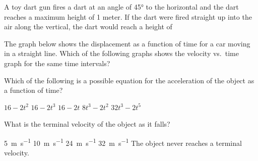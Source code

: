 \documentclass{../../../oss-classkick-exam}
\begin{document}
\begin{multicols*}{2}
\begin{questions}
    \question A toy dart gun fires a dart at an angle of \ang{45} to the
    horizontal and the dart reaches a maximum height of 1 meter. If the dart
    were fired straight up into the air along the vertical, the dart would
    reach a height of
    \columnbreak
    
    \question The graph below shows the displacement as a function of time for a
    car moving in a straight line. Which of the following graphs shows the
    velocity vs.\ time graph for the same time intervals?
    \\
    \columnbreak
    

    \question Which of the following is a possible equation for the
    acceleration of the object as a function of time?
    \begin{choices}
      \choice $16-2t^2$
      \choice $16-2t^3$
      \choice $16-2t$
      \choice $8t^3-2t^2$
      \choice $32t^3-2t^5$
    \end{choices}
    \label{q:fall1}
    
    \question What is the terminal velocity of the object as it falls?
    \begin{choices}
      \choice \SI{5}{\metre\per\second}
      \choice \SI{10}{\metre\per\second}
      \choice \SI{24}{\metre\per\second}
      \choice \SI{32}{\metre\per\second}
      \choice The object never reaches a terminal velocity.
    \end{choices}
    \label{q:fall2}
  \end{questions}
\end{multicols*}
\newpage


\genfreedirections
\end{document}
